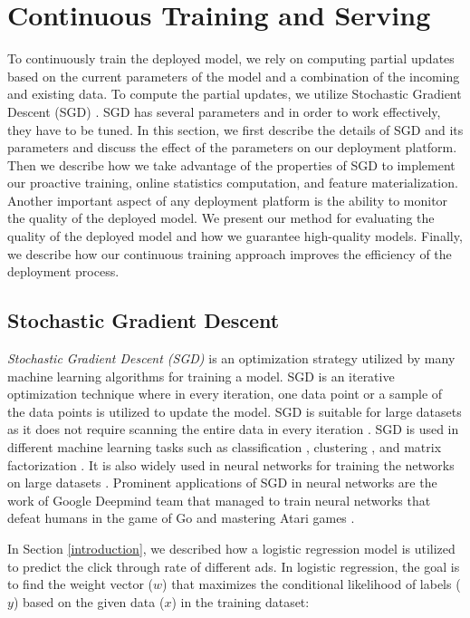 \section{Continuous Training and Serving} \label{continuous-training-serving}
To continuously train the deployed model, we rely on computing partial updates based on the current parameters of the model and a combination of the incoming and existing data.
To compute the partial updates, we utilize Stochastic Gradient Descent (SGD) \cite{zhang2004solving}.
SGD has several parameters and in order to work effectively, they have to be tuned.
In this section, we first describe the details of SGD and its parameters and discuss the effect of the parameters on our deployment platform.
Then we describe how we take advantage of the properties of SGD to implement our proactive training, online statistics computation, and feature materialization.
Another important aspect of any deployment platform is the ability to monitor the quality of the deployed model.
We present our method for evaluating the quality of the deployed model and how we guarantee high-quality models.
Finally, we describe how our continuous training approach improves the efficiency of the deployment process.

\subsection{Stochastic Gradient Descent} \label{sgd}
\textit{Stochastic Gradient Descent (SGD)} is an optimization strategy utilized by many machine learning algorithms for training a model.
SGD is an iterative optimization technique where in every iteration, one data point or a sample of the data points is utilized to update the model.
SGD is suitable for large datasets as it does not require scanning the entire data in every iteration \cite{bottou2010large}.
SGD is used in different machine learning tasks such as classification \cite{zhang2004solving, macmahan2013}, clustering \cite{bottou1995convergence}, and matrix factorization \cite{koren2009matrix,  funk2006netflix}.
It is also widely used in neural networks for training the networks on large datasets \cite{dean2012large}.
Prominent applications of SGD in neural networks are the work of Google Deepmind team that managed to train neural networks that defeat humans in the game of Go \cite{silver2016mastering} and mastering Atari games \cite{mnih2013playing}.

In Section \ref{introduction}, we described how a logistic regression model is utilized to predict the click through rate of different ads.
In logistic regression, the goal is to find the weight vector ($w$) that maximizes the conditional likelihood of labels ($y$) based on the given data ($x$) in the training dataset:

